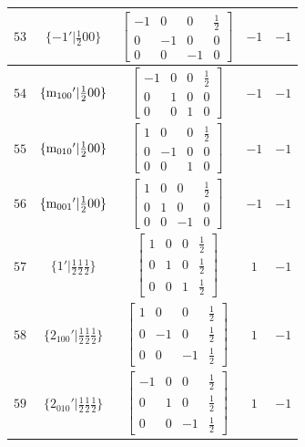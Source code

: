 \documentclass[fleqn,8pt]{jsarticle}
\begin{document}
\begin{longtable}{ccccc}
$ 53 $ & $ \{-1{}'|\frac{1}{2} 0 0\} $ & $ \begin{bmatrix} -1 & 0 & 0 & \frac{1}{2} \\ 0 & -1 & 0 & 0 \\ 0 & 0 & -1 & 0 \end{bmatrix} $ & $ -1 $ & $ -1 $ \\ \hline
$ 54 $ & $ \{{\rm m}_{100}{}'|\frac{1}{2} 0 0\} $ & $ \begin{bmatrix} -1 & 0 & 0 & \frac{1}{2} \\ 0 & 1 & 0 & 0 \\ 0 & 0 & 1 & 0 \end{bmatrix} $ & $ -1 $ & $ -1 $ \\ \hline
$ 55 $ & $ \{{\rm m}_{010}{}'|\frac{1}{2} 0 0\} $ & $ \begin{bmatrix} 1 & 0 & 0 & \frac{1}{2} \\ 0 & -1 & 0 & 0 \\ 0 & 0 & 1 & 0 \end{bmatrix} $ & $ -1 $ & $ -1 $ \\ \hline
$ 56 $ & $ \{{\rm m}_{001}{}'|\frac{1}{2} 0 0\} $ & $ \begin{bmatrix} 1 & 0 & 0 & \frac{1}{2} \\ 0 & 1 & 0 & 0 \\ 0 & 0 & -1 & 0 \end{bmatrix} $ & $ -1 $ & $ -1 $ \\ \hline
$ 57 $ & $ \{1{}'|\frac{1}{2} \frac{1}{2} \frac{1}{2}\} $ & $ \begin{bmatrix} 1 & 0 & 0 & \frac{1}{2} \\ 0 & 1 & 0 & \frac{1}{2} \\ 0 & 0 & 1 & \frac{1}{2} \end{bmatrix} $ & $ 1 $ & $ -1 $ \\ \hline
$ 58 $ & $ \{2{}_{100}{}'|\frac{1}{2} \frac{1}{2} \frac{1}{2}\} $ & $ \begin{bmatrix} 1 & 0 & 0 & \frac{1}{2} \\ 0 & -1 & 0 & \frac{1}{2} \\ 0 & 0 & -1 & \frac{1}{2} \end{bmatrix} $ & $ 1 $ & $ -1 $ \\ \hline
$ 59 $ & $ \{2{}_{010}{}'|\frac{1}{2} \frac{1}{2} \frac{1}{2}\} $ & $ \begin{bmatrix} -1 & 0 & 0 & \frac{1}{2} \\ 0 & 1 & 0 & \frac{1}{2} \\ 0 & 0 & -1 & \frac{1}{2} \end{bmatrix} $ & $ 1 $ & $ -1 $ \\ \hline

\end{longtable}
\end{document}
